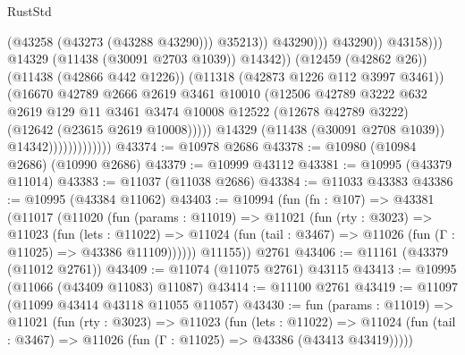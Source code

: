 \begin{lexlean}{RustStd}
\begin{coremodule}
                                                        (@43258 (@43273 (@43288 @43290)))
                                                        @35213))
                                                    @43290)))
                                              @43290))
                                          @43158)))
                                    @14329
                                    (@11438 (@30091 @2703 @1039))
                                    @14342))
                                (@12459 (@42862 @26))
                                (@11438 (@42866 @442 @1226))
                                (@11318 (@42873 @1226 @112 @3997 @3461))
                                (@16670
                                  @42789
                                  @2666
                                  @2619
                                  @3461
                                  @10010
                                  (@12506
                                    @42789
                                    @3222
                                    @632
                                    @2619
                                    @129
                                    @11
                                    @3461
                                    @3474
                                    @10008
                                    @12522
                                    (@12678 @42789 @3222)
                                    (@12642 (@23615 @2619 @10008)))))
                              @14329
                              (@11438 (@30091 @2708 @1039))
                              @14342)))))))))))))
@43374 := @10978 @2686
@43378 := @10980 (@10984 @2686) (@10990 @2686)
@43379 := @10999 @43112
@43381 := @10995 (@43379 @11014)
@43383 := @11037 (@11038 @2686)
@43384 := @11033 @43383
@43386 := @10995 (@43384 @11062)
@43403 := @10994
    (fun (fn : @107) =>
    @43381
      (@11017
        (@11020
          (fun (params : @11019) =>
          @11021
            (fun (rty : @3023) =>
            @11023
              (fun (lets : @11022) =>
              @11024 (fun (tail : @3467) => @11026 (fun (Γ : @11025) => @43386 @11109))))))
        @11155))
    @2761
@43406 := @11161 (@43379 (@11012 @2761))
@43409 := @11074 (@11075 @2761) @43115
@43413 := @10995 (@11066 (@43409 @11083) @11087)
@43414 := @11100 @2761
@43419 := @11097 (@11099 @43414 @43118 @11055 @11057)
@43430 := fun (params : @11019) =>
  @11021
    (fun (rty : @3023) =>
    @11023
      (fun (lets : @11022) =>
      @11024 (fun (tail : @3467) => @11026 (fun (Γ : @11025) => @43386 (@43413 @43419)))))

\end{coremodule}
\end{lexlean}
